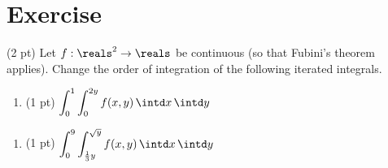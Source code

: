 \section{Exercise}

(2 pt) Let $f: \reals^{2} \rightarrow \reals$ be continuous (so that Fubini's theorem applies). Change the order of integration of the following iterated integrals. 
\begin{enumerate}[label=(\alph*)]
\item (1 pt) $\displaystyle\int_{0}^{1} \int_{0}^{2 y} f(x,y) \, \intd x \, \intd y$
\end{enumerate}

\spaceSolution{2.5in}{%
}%

\begin{enumerate}[resume,label=(\alph*)]
\item (1 pt) $\displaystyle\int_{0}^{9} \int_{\frac{1}{3} y}^{\sqrt{y}} f(x,y) \, \intd x \, \intd y$
\end{enumerate}

\spaceSolution{2.5in}{%
}%